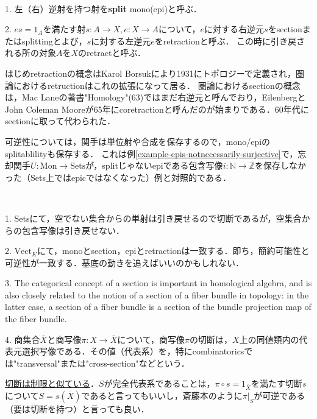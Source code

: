 \documentclass[uplatex, dvipdfmx]{jsarticle}
\begin{document}
\begin{definition}　

    1. 左（右）逆射を持つ射を\textbf{split} mono(epi)と呼ぶ．

    2. $es=1_A$を満たす射$s:A\to X, e:X\to A$について，$e$に対する右逆元$s$をsectionまたはsplittingとよび，$s$に対する左逆元$e$をretractionと呼ぶ．
    この時に引き戻される所の対象$A$を$X$のretractと呼ぶ．
    \begin{center}
    \end{center}
\end{definition}
\begin{remark*}
    はじめretractionの概念はKarol Borsukにより1931にトポロジーで定義され，圏論におけるretructionはこれの拡張になって居る．
    圏論におけるsectionの概念は，Mac Laneの著書"Homology"(63)ではまだ右逆元と呼んでおり，EilenbergとJohn Coleman Mooreが65年にcoretractionと呼んだのが始まりである．60年代にsectionに取って代わられた．

    可逆性については，関手は単位射や合成を保存するので，mono/epiのsplitablilityも保存する．
    これは例\ref{example-epis-notnecessarily-surjective}で，忘却関手$U:\mathrm{Mon}\to\mathrm{Sets}$が，splitじゃないepiである包含写像$i:\mathbb{N}\to\mathbb{Z}$を保存しなかった（Sets上ではepicではなくなった）例と対照的である．
\end{remark*}
\begin{example*}　
    
    1. Setsにて，空でない集合からの単射は引き戻せるので切断であるが，空集合からの包含写像は引き戻せない．

    2. $\mathrm{Vect}_K$にて，monoとsection，epiとretractionは一致する．即ち，簡約可能性と可逆性が一致する．基底の動きを追えばいいのかもしれない．

    3. The categorical concept of a section is important in homological algebra, and is also closely related to the notion of a section of a fiber bundle in topology: in the latter case, a section of a fiber bundle is a section of the bundle projection map of the fiber bundle.

    4. 商集合$\overline{X}$と商写像$\pi :X\to\overline{X}$について，商写像$\pi$の切断は，$X$上の同値類内の代表元選択写像である．その値（代表系）を，特にcombinatoricsでは"transversal"または"cross-section"などという．

    \underline{切断は制限と似ている}．$S$が完全代表系であることは，$\pi\circ s=1_{\overline{X}}$を満たす切断$s$について$S=s(\overline{X})$であると言ってもいいし，斎藤本のように$\pi |_S$が可逆である（要は切断を持つ）と言っても良い．
\end{example*}
\end{document}
